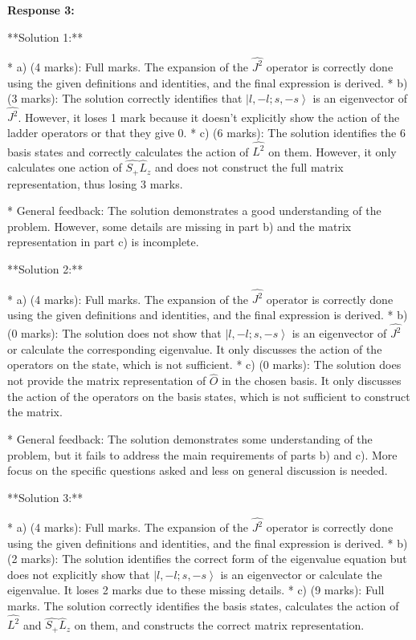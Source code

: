 \documentclass[a4paper,11pt]{article}
\begin{document}
\textbf{Response 3:}

**Solution 1:**

* a) (4 marks): Full marks. The expansion of the \( \hat{J^2} \) operator is correctly done using the given definitions and identities, and the final expression is derived.
* b) (3 marks): The solution correctly identifies that \( \left|l, -l; s, -s \right> \) is an eigenvector of \( \hat{J^2} \). However, it loses 1 mark because it doesn't explicitly show the action of the ladder operators or that they give 0.
* c) (6 marks): The solution identifies the 6 basis states and correctly calculates the action of \( \hat{L^{2}} \) on them. However, it only calculates one action of \( \hat{S_{+}}\hat{L}_{z} \) and does not construct the full matrix representation, thus losing 3 marks. 

* General feedback: The solution demonstrates a good understanding of the problem. However, some details are missing in part b) and the matrix representation in part c) is incomplete.

**Solution 2:**

* a) (4 marks): Full marks. The expansion of the \( \hat{J^2} \) operator is correctly done using the given definitions and identities, and the final expression is derived.
* b) (0 marks): The solution does not show that \( \left|l, -l; s, -s \right> \) is an eigenvector of \( \hat{J^2} \) or calculate the corresponding eigenvalue. It only discusses the action of the operators on the state, which is not sufficient.
* c) (0 marks): The solution does not provide the matrix representation of \( \hat{O} \) in the chosen basis. It only discusses the action of the operators on the basis states, which is not sufficient to construct the matrix.

* General feedback: The solution demonstrates some understanding of the problem, but it fails to address the main requirements of parts b) and c). More focus on the specific questions asked and less on general discussion is needed.

**Solution 3:**

* a) (4 marks): Full marks. The expansion of the \( \hat{J^2} \) operator is correctly done using the given definitions and identities, and the final expression is derived.
* b) (2 marks): The solution identifies the correct form of the eigenvalue equation but does not explicitly show that \( \left|l, -l; s, -s \right> \) is an eigenvector or calculate the eigenvalue. It loses 2 marks due to these missing details.
* c) (9 marks): Full marks. The solution correctly identifies the basis states, calculates the action of \( \hat{L^2} \) and \( \hat{S_{+}}\hat{L}_{z} \) on them, and constructs the correct matrix representation.
\end{document}
